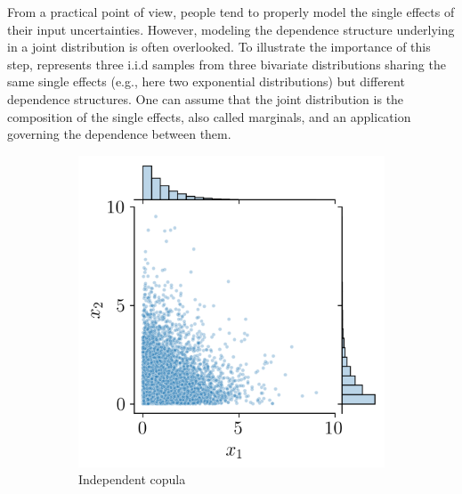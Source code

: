 From a practical point of view, people tend to properly model the single effects of their input uncertainties. 
However, modeling the dependence structure underlying in a joint distribution is often overlooked.  
To illustrate the importance of this step,  represents three i.i.d samples from three bivariate distributions sharing the same single effects (e.g., here two exponential distributions) but different dependence structures.
One can assume that the joint distribution is the composition of the single effects, also called marginals, and an application governing the dependence between them.
\begin{figure}[ht]
    \centering
    \begin{subfigure}[b]{0.32\textwidth}
        \centering
        \includegraphics[width=\textwidth]{../numerical_experiments/chapter1/figures/independent_copula.png}
        \caption{Independent copula}
    \end{subfigure}
    \hfill
    \begin{subfigure}[b]{0.32\textwidth}
        \centering

\end{subfigure}
\end{figure}

